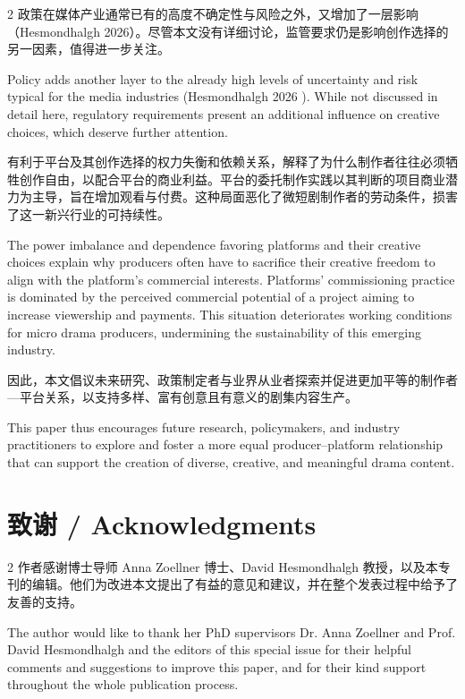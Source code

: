 \documentclass[10pt,a4paper]{article}
\begin{document}
\begin{paracol}{2}
\switchcolumn*
政策在媒体产业通常已有的高度不确定性与风险之外，又增加了一层影响（Hesmondhalgh 2026）。尽管本文没有详细讨论，监管要求仍是影响创作选择的另一因素，值得进一步关注。\par
\switchcolumn
Policy adds another layer to the already high levels of uncertainty and risk typical for the media industries (Hesmondhalgh 2026 ). While not discussed in detail here, regulatory requirements present an additional influence on creative choices, which deserve further attention.\par
\switchcolumn*
有利于平台及其创作选择的权力失衡和依赖关系，解释了为什么制作者往往必须牺牲创作自由，以配合平台的商业利益。平台的委托制作实践以其判断的项目商业潜力为主导，旨在增加观看与付费。这种局面恶化了微短剧制作者的劳动条件，损害了这一新兴行业的可持续性。\par
\switchcolumn
The power imbalance and dependence favoring platforms and their creative choices explain why producers often have to sacrifice their creative freedom to align with the platform’s commercial interests. Platforms’ commissioning practice is dominated by the perceived commercial potential of a project aiming to increase viewership and payments. This situation deteriorates working conditions for micro drama producers, undermining the sustainability of this emerging industry.\par
\switchcolumn*
因此，本文倡议未来研究、政策制定者与业界从业者探索并促进更加平等的制作者—平台关系，以支持多样、富有创意且有意义的剧集内容生产。\par
\switchcolumn
This paper thus encourages future research, policymakers, and industry practitioners to explore and foster a more equal producer–platform relationship that can support the creation of diverse, creative, and meaningful drama content.\par
\switchcolumn*
\end{paracol}
\section*{致谢 / Acknowledgments}
\begin{paracol}{2}
作者感谢博士导师 Anna Zoellner 博士、David Hesmondhalgh 教授，以及本专刊的编辑。他们为改进本文提出了有益的意见和建议，并在整个发表过程中给予了友善的支持。\par
\switchcolumn
The author would like to thank her PhD supervisors Dr. Anna Zoellner and Prof. David Hesmondhalgh and the editors of this special issue for their helpful comments and suggestions to improve this paper, and for their kind support throughout the whole publication process.\par
\switchcolumn*
\end{paracol}
\end{document}

